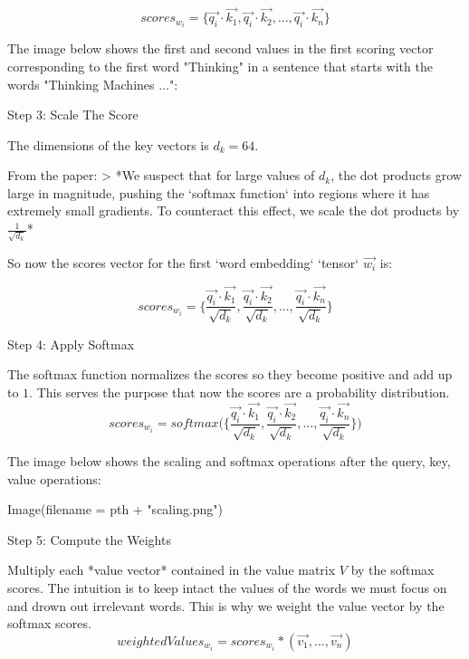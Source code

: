 $$
scores_{w_i} = \bigg\{
\overrightarrow{q_i} \cdot \overrightarrow{k_1},
\overrightarrow{q_i} \cdot \overrightarrow{k_2},
...,
\overrightarrow{q_i} \cdot \overrightarrow{k_n} \bigg\}
$$

The image below shows the first and second values in the first scoring vector corresponding to the first word "Thinking" in a sentence that starts with the words "Thinking Machines ...":


Step 3: Scale The Score

The dimensions of the  key vectors is $d_k = 64$.

From the paper:
> *We suspect that for large values of $d_k$, the dot products grow large in  magnitude, pushing the `softmax function` into regions where it has extremely small gradients. To counteract this effect, we scale the dot products by $\frac {1} {\sqrt{d_k}}$*

So now the scores vector for the first `word embedding` `tensor` $\overrightarrow{w_i}$ is:

$$
scores_{w_i} = \Bigg\{
\frac {\overrightarrow{q_i} \cdot \overrightarrow{k_1}} {\sqrt{d_k}},
\frac {\overrightarrow{q_i} \cdot \overrightarrow{k_2}} {\sqrt{d_k}},
...,
\frac{\overrightarrow{q_i} \cdot \overrightarrow{k_n}} {\sqrt{d_k}} \Bigg\}
$$


Step 4: Apply Softmax

The softmax function normalizes the scores so they become positive and add up to $1$. This serves the purpose that now the scores are a probability distribution.
$$
scores_{w_i} = softmax \Bigg( \Bigg\{
\frac {\overrightarrow{q_i} \cdot \overrightarrow{k_1}} {\sqrt{d_k}},
\frac {\overrightarrow{q_i} \cdot \overrightarrow{k_2}} {\sqrt{d_k}},
...,
\frac{\overrightarrow{q_i} \cdot \overrightarrow{k_n}} {\sqrt{d_k}} \Bigg\} \Bigg)
$$

The image below shows the scaling and softmax operations after the query, key, value operations:

Image(filename = pth + "scaling.png")

Step 5: Compute the Weights

Multiply each *value vector* contained in the value matrix $V$ by the softmax scores. The intuition is to keep intact the values of the words we must focus on and drown out irrelevant words. This is why we weight the value vector by the softmax scores.
$$
weightedValues_{w_i} = scores_{w_i} * (\overrightarrow{v_1}, ..., \overrightarrow{v_n})
$$


